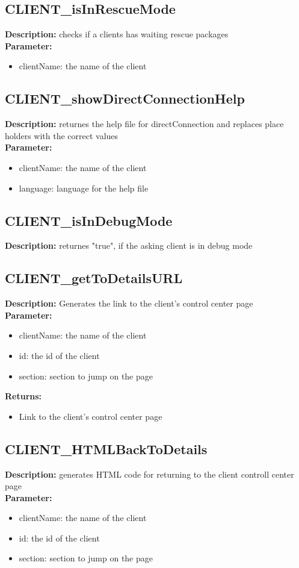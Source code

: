 \subsection{CLIENT\_isInRescueMode}
\textbf{Description:} checks if a clients has waiting rescue packages\\
\textbf{Parameter:}
\begin{itemize}
\item clientName: the name of the client
\end{itemize}

\subsection{CLIENT\_showDirectConnectionHelp}
\textbf{Description:} returnes the help file for directConnection and replaces place holders with the correct values\\
\textbf{Parameter:}
\begin{itemize}
\item clientName: the name of the client
\item language: language for the help file
\end{itemize}

\subsection{CLIENT\_isInDebugMode}
\textbf{Description:} returnes "true", if the asking client is in debug mode\\

\subsection{CLIENT\_getToDetailsURL}
\textbf{Description:} Generates the link to the client's control center page\\
\textbf{Parameter:}
\begin{itemize}
\item clientName: the name of the client
\item id: the id of the client
\item section: section to jump on the page
\end{itemize}
\textbf{Returns:}
\begin{itemize}
\item Link to the client's control center page
\end{itemize}

\subsection{CLIENT\_HTMLBackToDetails}
\textbf{Description:} generates HTML code for returning to the client controll center page\\
\textbf{Parameter:}
\begin{itemize}
\item clientName: the name of the client
\item id: the id of the client
\item section: section to jump on the page
\end{itemize}

